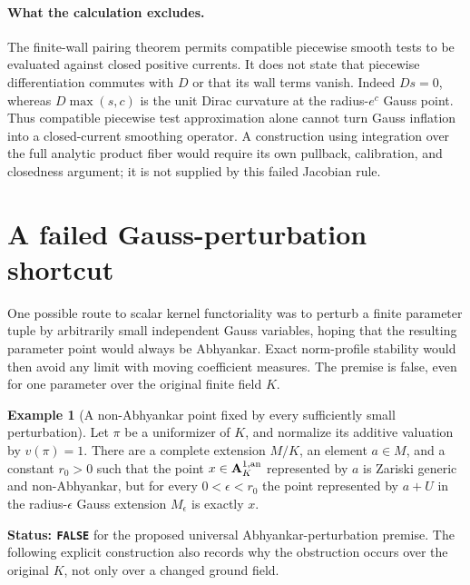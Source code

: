 \documentclass[11pt,a4paper]{article}
\numberwithin{equation}{section}
\theoremstyle{definition}
\newtheorem{example}[theorem]{Example}
\theoremstyle{remark}
\begin{document}
\paragraph{What the calculation excludes.}
The finite-wall pairing theorem permits compatible piecewise smooth
tests to be evaluated against closed positive currents.  It does
not state that piecewise differentiation commutes with $D$ or that
its wall terms vanish.  Indeed $Ds=0$, whereas
$D\max(s,c)$ is the unit Dirac curvature at the radius-$e^c$
Gauss point.  Thus compatible piecewise test approximation alone
cannot turn Gauss inflation into a closed-current smoothing
operator.  A construction using integration over the full analytic
product fiber would require its own pullback, calibration, and
closedness argument; it is not supplied by this failed Jacobian
rule.



\section{A failed Gauss-perturbation shortcut}
\label{sec:r5-gauss-perturbation-obstruction}

One possible route to scalar kernel functoriality was to perturb a
finite parameter tuple by arbitrarily small independent Gauss
variables, hoping that the resulting parameter point would always
be Abhyankar.  Exact norm-profile stability would then avoid any
limit with moving coefficient measures.  The premise is false,
even for one parameter over the original finite field $K$.

\begin{example}[A non-Abhyankar point fixed by every sufficiently small perturbation]
\label{ex:r5-gauss-perturbation-fixed-type-four}
Let $\pi$ be a uniformizer of $K$, and normalize its additive
valuation by $v(\pi)=1$.  There are a complete extension $M/K$, an
element $a\in M$, and a constant $r_0>0$ such that the point
$x\in\mathbf A_K^{1,\rm an}$ represented by $a$ is Zariski generic
and non-Abhyankar, but for every $0<\epsilon<r_0$ the point
represented by $a+U$ in the radius-$\epsilon$ Gauss extension
$M_\epsilon$ is exactly $x$.
\end{example}

\noindent\textbf{Status: \texttt{FALSE}} for the proposed universal
Abhyankar-perturbation premise.  The following explicit construction
also records why the obstruction occurs over the original $K$,
not only over a changed ground field.
\end{document}
